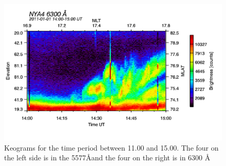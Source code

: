 \begin{figure}
\begin{minipage}{0.24\textwidth}
\end{minipage}
\begin{minipage}{0.24\textwidth}
\includegraphics[width=\textwidth]{Figures/Allsky/6300/nya4_20110101_1400_1500_6300_cal.png}
\end{minipage}


\caption{Keograms for the time period between 11.00 and 15.00. The four on the left side is in the 5577\AA and the four on the right is in 6300 \AA}
\end{figure}

